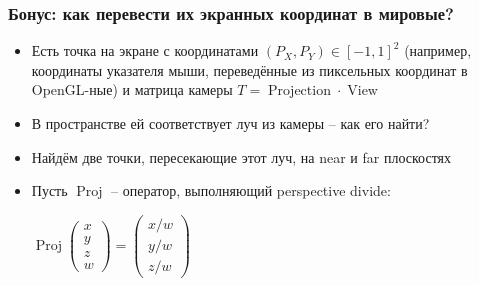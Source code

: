 \documentclass[10pt]{beamer}
\begin{document}
\begin{frame}[fragile]
\frametitle{Бонус: как перевести их экранных координат в мировые?}
\begin{itemize}
\item Есть точка на экране с координатами \begin{math}(P_X, P_Y) \in [-1, 1]^2\end{math} (например, координаты указателя мыши, переведённые из пиксельных координат в OpenGL-ные) и матрица камеры \begin{math}T=\operatorname{Projection}\cdot\operatorname{View}\end{math}
\pause
\item В пространстве ей соответствует луч из камеры -- как его найти?
\pause
\item Найдём две точки, пересекающие этот луч, на near и far плоскостях
\pause
\item Пусть \begin{math}\operatorname{Proj}\end{math} -- оператор, выполняющий perspective divide:
\begin{center}
\begin{math}
\operatorname{Proj}\begin{pmatrix}x \\ y \\ z \\ w\end{pmatrix} = \begin{pmatrix}x/w \\ y/w \\ z/w\end{pmatrix}
\end{math}
\end{center}
\end{itemize}
\end{frame}
\end{document}
